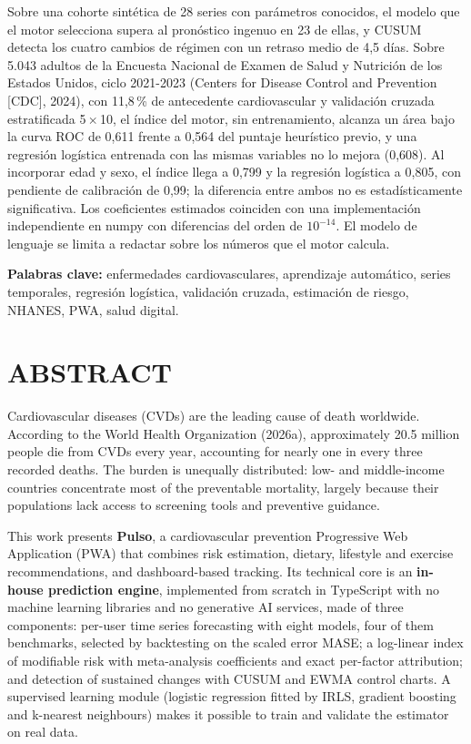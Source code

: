 \documentclass[12pt,letterpaper]{article}
\begin{document}
Sobre una cohorte sintética de 28 series con parámetros conocidos, el modelo que
el motor selecciona supera al pronóstico ingenuo en 23 de ellas, y CUSUM detecta
los cuatro cambios de régimen con un retraso medio de 4,5 días. Sobre 5.043
adultos de la Encuesta Nacional de Examen de Salud y Nutrición de los Estados
Unidos, ciclo 2021-2023 (Centers for Disease Control and Prevention [CDC], 2024),
con 11,8\,\% de antecedente cardiovascular y validación cruzada estratificada
5\,$\times$\,10, el índice del motor, sin entrenamiento, alcanza un área bajo la
curva ROC de 0,611 frente a 0,564 del puntaje heurístico previo, y una regresión
logística entrenada con las mismas variables no lo mejora (0,608). Al incorporar
edad y sexo, el índice llega a 0,799 y la regresión logística a 0,805, con
pendiente de calibración de 0,99; la diferencia entre ambos no es
estadísticamente significativa. Los coeficientes estimados coinciden con una
implementación independiente en numpy con diferencias del orden de $10^{-14}$. El
modelo de lenguaje se limita a redactar sobre los números que el motor calcula.

\vspace{0.4cm}
\noindent\textbf{Palabras clave:} enfermedades cardiovasculares, aprendizaje
automático, series temporales, regresión logística, validación cruzada,
estimación de riesgo, NHANES, PWA, salud digital.

\newpage

\section*{ABSTRACT}


Cardiovascular diseases (CVDs) are the leading cause of death worldwide.
According to the World Health Organization (2026a), approximately 20.5 million
people die from CVDs every year, accounting for nearly one in every three
recorded deaths. The burden is unequally distributed: low- and middle-income
countries concentrate most of the preventable mortality, largely because their
populations lack access to screening tools and preventive guidance.

This work presents \textbf{Pulso}, a cardiovascular prevention Progressive Web
Application (PWA) that combines risk estimation, dietary, lifestyle and exercise
recommendations, and dashboard-based tracking. Its technical core is an
\textbf{in-house prediction engine}, implemented from scratch in TypeScript with
no machine learning libraries and no generative AI services, made of three
components: per-user time series forecasting with eight models, four of them
benchmarks, selected by backtesting on the scaled error MASE; a log-linear index
of modifiable risk with meta-analysis coefficients and exact per-factor
attribution; and detection of sustained changes with CUSUM and EWMA control
charts. A supervised learning module (logistic regression fitted by IRLS,
gradient boosting and k-nearest neighbours) makes it possible to train and
validate the estimator on real data.
\end{document}
